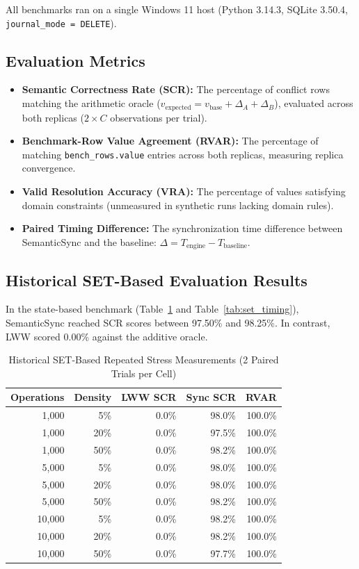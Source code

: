 \documentclass[conference]{IEEEtran}
\begin{document}
All benchmarks ran on a single Windows 11 host (Python 3.14.3, SQLite 3.50.4, \texttt{journal\_mode = DELETE}).

\subsection{Evaluation Metrics}
\begin{itemize}
    \item \textbf{Semantic Correctness Rate (SCR):} The percentage of conflict rows matching the arithmetic oracle ($v_{\text{expected}} = v_{\text{base}} + \Delta_A + \Delta_B$), evaluated across both replicas ($2 \times C$ observations per trial).
    \item \textbf{Benchmark-Row Value Agreement (RVAR):} The percentage of matching \texttt{bench\_rows.value} entries across both replicas, measuring replica convergence.
    \item \textbf{Valid Resolution Accuracy (VRA):} The percentage of values satisfying domain constraints (unmeasured in synthetic runs lacking domain rules).
    \item \textbf{Paired Timing Difference:} The synchronization time difference between SemanticSync and the baseline: $\Delta = T_{\text{engine}} - T_{\text{baseline}}$.
\end{itemize}

\subsection{Historical SET-Based Evaluation Results}
In the state-based benchmark (Table~\ref{tab:set_stress} and Table~\ref{tab:set_timing}), SemanticSync reached SCR scores between 97.50\% and 98.25\%. In contrast, LWW scored 0.00\% against the additive oracle.

\begin{table}[!t]
\centering
\caption{Historical SET-Based Repeated Stress Measurements (2 Paired Trials per Cell)}
\label{tab:set_stress}
\begin{tabular}{rrrrr}
\toprule
\textbf{Operations} & \textbf{Density} & \textbf{LWW SCR} & \textbf{Sync SCR} & \textbf{RVAR} \\
\midrule
1,000 & 5\% & 0.0\% & 98.0\% & 100.0\% \\
1,000 & 20\% & 0.0\% & 97.5\% & 100.0\% \\
1,000 & 50\% & 0.0\% & 98.2\% & 100.0\% \\
5,000 & 5\% & 0.0\% & 98.0\% & 100.0\% \\
5,000 & 20\% & 0.0\% & 98.0\% & 100.0\% \\
5,000 & 50\% & 0.0\% & 98.2\% & 100.0\% \\
10,000 & 5\% & 0.0\% & 98.2\% & 100.0\% \\
10,000 & 20\% & 0.0\% & 98.2\% & 100.0\% \\
10,000 & 50\% & 0.0\% & 97.7\% & 100.0\% \\
\bottomrule
\end{tabular}
\end{table}
\end{document}
